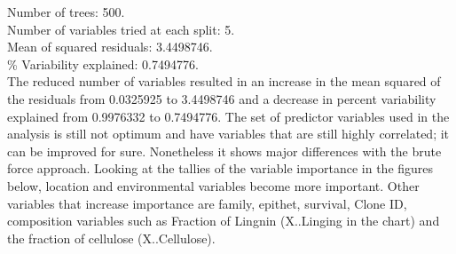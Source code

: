 \documentclass{article}\usepackage[]{graphicx}\usepackage[]{color}
\begin{document}
Number of trees: 500.\\

Number of variables tried at each split: 5.\\

Mean of squared residuals: 3.4498746. \\

\% Variability explained:  0.7494776.\\ 

The reduced number of variables resulted in an increase in the mean squared of the residuals from 0.0325925  to  3.4498746 and a decrease in percent variability explained from  0.9976332   to    0.7494776.
The set of predictor variables used in the analysis is still not optimum and have variables that are still highly correlated; it can be improved for sure. Nonetheless it shows major differences with the brute force approach. Looking at the tallies of the variable importance in the figures below, location and environmental variables become more important. Other variables that increase importance are family, epithet, survival, Clone ID, composition variables such as Fraction of Lingnin (X..Linging in the chart) and the fraction of cellulose (X..Cellulose). \\
\end{document}
